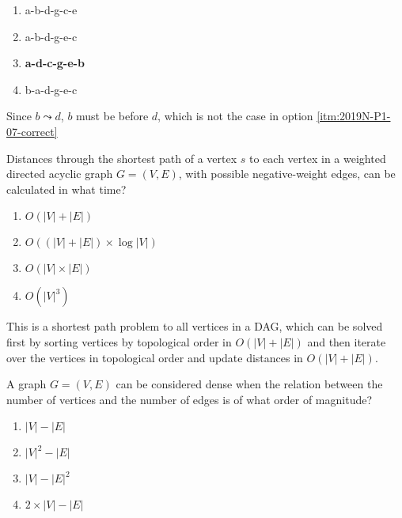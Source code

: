 {\begin{center}
\end{center}
\begin{enumerate}[label=\Alph*)]\itemsep0em
    \item a-b-d-g-c-e
    \item a-b-d-g-e-c 
    \item \label{itm:2019N-P1-07-correct} \textbf{a-d-c-g-e-b \greencheckmark}
    \item b-a-d-g-e-c
\end{enumerate}

\ansseparator

Since $b \leadsto d$, $b$ must be before $d$, which is not the case in option \ref{itm:2019N-P1-07-correct}

Distances through the shortest path of a vertex $s$ to each vertex in a weighted directed acyclic graph $G=(V,E)$, with possible negative-weight edges, can be calculated in what time?
\begin{enumerate}[label=\Alph*)]\itemsep0em
    \item $O(|V|+|E|)$ \greencheckmark
    \item $O((|V|+|E|) \times \log |V|)$
    \item $O(|V|\times|E|)$
    \item $O(|V|^3)$
\end{enumerate}

\ansseparator

This is a shortest path problem to all vertices in a DAG, which can be solved first by sorting vertices by topological order in $O(|V|+|E|)$ and then iterate over the vertices in topological order and update distances in $O(|V|+|E|)$.

A graph $G=(V,E)$ can be considered dense when the relation between the number of vertices and the number of edges is of what order of magnitude?
\begin{enumerate}[label=\Alph*)]\itemsep0em
    \item $|V|-|E|$
    \item $|V|^2-|E|$ \greencheckmark
    \item $|V|-|E|^2$
    \item $2 \times |V| - |E|$
\end{enumerate}

}
